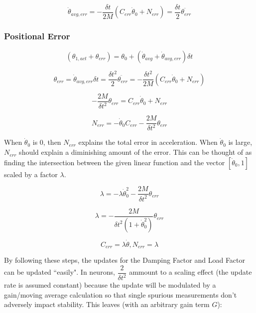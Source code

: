 \documentclass[12pt, letterpaper, oneside, notitlepage, onecolumn]{article}
\newcommand{\bbsss}[1]{\subsubsection{#1}}
\begin{document}
\begin{equation}
\dot{\theta}_{avg, err} = - \dfrac{\delta t}{2M}(C_{err} \dot{\theta}_{0} + N_{err}) = \dfrac{\delta t}{2} \ddot{\theta_{err}}
\end{equation}

\bbsss{Positional Error}

\begin{equation}
(\theta_{1, act} + \theta_{err}) = \theta_{0} + (\dot{\theta}_{avg} + \dot{\theta}_{avg, err}) \delta t
\end{equation}

\begin{equation}
\theta_{err} = \dot{\theta}_{avg, err} \delta t = \dfrac{\delta t^{2}}{2} \ddot{\theta_{err}} = - \dfrac{\delta t^{2}}{2M}(C_{err} \dot{\theta}_{0} + N_{err})
\end{equation}

\begin{equation}
- \dfrac{2M}{\delta t^{2}} \theta_{err} = C_{err} \dot{\theta}_{0} + N_{err}
\end{equation}

\begin{equation}
N_{err} = 
- \dot{\theta}_{0} C_{err}
- \dfrac{2M}{\delta t^{2}} \theta_{err}
\end{equation}

When $\dot{\theta}_{0}$ is 0, then $N_{err}$ explains the total error in acceleration. When $\dot{\theta}_{0}$ is large, $N_{err}$ should explain a diminishing amount of the error. This can be thought of as finding the intersection between the given linear function and the vector $[\dot{\theta}_{0}, 1]$ scaled by a factor $\lambda$.

\begin{equation}
\lambda = 
- \lambda \dot{\theta}_{0}^{2}
- \dfrac{2M}{\delta t^{2}} \theta_{err}
\end{equation}

\begin{equation}
\lambda 
=
- \dfrac{2M}{\delta t^{2} (1 + \dot{\theta}_{0}^{2})} \theta_{err}
\end{equation}

\begin{equation}
C_{err} = \lambda \dot{\theta}, N_{err} = \lambda
\end{equation}

By following these steps, the updates for the Damping Factor and Load Factor can be updated ``easily". In neurons, $\dfrac{2}{\delta t^{2}}$ ammount to a scaling effect (the update rate is assumed constant) because the update will be modulated by a gain/moving average calculation so that single spurious measurements don't adversely impact stability. This leaves (with an arbitrary gain term $G$):
\end{document}

